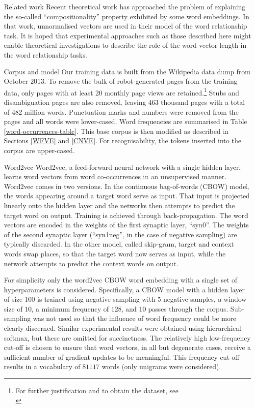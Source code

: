 \documentclass{article} %
\begin{document}
\begin{section}{Related work}
Recent theoretical work \cite{Arora2015} has approached the problem of explaining the so-called ``compositionality'' property exhibited by some word embeddings.
In that work, unnormalised vectors are used in their model of the word relationship task.
It is hoped that experimental approaches such as those described here might enable theoretical investigations to describe the role of the word vector length in the word relationship tasks.
\end{section}

\begin{section}{Corpus and model}\label{corpus-and-model}
Our training data is built from the Wikipedia data dump from October
2013.  To remove the bulk of robot-generated pages from the training
data, only pages with at least 20 monthly page views are
retained.\footnote{For further justification and to obtain the dataset,
  see\\ \blogpost} Stubs and disambiguation pages are also removed,
leaving 463 thousand pages with a total of 482 million words.
Punctuation marks and numbers were removed from the pages and all words
were lower-cased.  Word frequencies are summarised 
in Table \ref{word-occurrences-table}.  This base corpus is then
modified as described in Sections \ref{WFVE} and \ref{CNVE}.  For
recognisability, the tokens inserted into the corpus are upper-cased.

\begin{subsection}{Word2vec}\label{word2vec}
Word2vec, a feed-forward neural network with a single hidden
layer, learns word vectors from word co-occurrences in an unsupervised
manner.  Word2vec comes in two versions.  In the continuous bag-of-words
(CBOW) model, the words appearing around a target word serve as input.
That input is projected linearly onto the hidden layer and the networks
then attempts to predict the target word on output.  Training is
achieved through back-propagation.  The word vectors are encoded in the
weights of the first synaptic layer, ``syn0''.  The weights of the
second synaptic layer (``syn1neg'', in the case of negative sampling) are typically discarded.  In the other model,
called skip-gram, target and context words swap places, so that the
target word now serves as input, while the network attempts to predict
the context words on output.

For simplicity only the word2vec CBOW word embedding with a single set
of hyperparameters is considered.  Specifically, a CBOW model with a
hidden layer of size 100 is trained using negative sampling with 5
negative samples, a window size of $10$, a minimum frequency of
$128$, and $10$ passes through the corpus.  Sub-sampling was not used so
that the influence of word frequency could be more clearly discerned.
Similar experimental results were obtained using hierarchical softmax,
but these are omitted for succinctness.  The relatively high
low-frequency cut-off is chosen to ensure that word vectors, in all but
degenerate cases, receive a sufficient number of gradient updates to be
meaningful.  This frequency cut-off results in a vocabulary of $81117$
words (only unigrams were considered).


\end{subsection}
\end{section}
\end{document}
